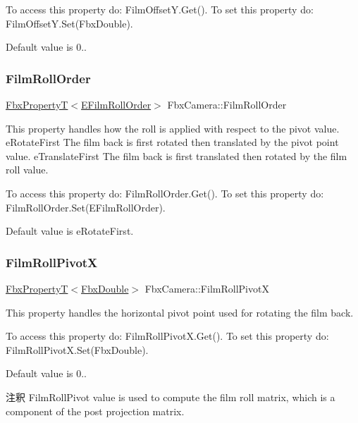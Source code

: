 To access this property do\+: Film\+Offset\+Y.\+Get(). To set this property do\+: Film\+Offset\+Y.\+Set(\+Fbx\+Double).

Default value is 0.. \mbox{\label{class_fbx_camera_ac7583ff2d3c73fa3e4f514ba29504be5}} 
\subsubsection{\texorpdfstring{Film\+Roll\+Order}{FilmRollOrder}}
{\footnotesize\ttfamily \hyperlink{class_fbx_property_t}{Fbx\+PropertyT}$<$\hyperlink{class_fbx_camera_a831d9b7ffcbf3611715eb2ad9108870b}{E\+Film\+Roll\+Order}$>$ Fbx\+Camera\+::\+Film\+Roll\+Order}

This property handles how the roll is applied with respect to the pivot value. e\+Rotate\+First The film back is first rotated then translated by the pivot point value. e\+Translate\+First The film back is first translated then rotated by the film roll value.

To access this property do\+: Film\+Roll\+Order.\+Get(). To set this property do\+: Film\+Roll\+Order.\+Set(\+E\+Film\+Roll\+Order).

Default value is e\+Rotate\+First. \mbox{\label{class_fbx_camera_af8db195197a3f0a6729533842e00fd18}} 
\subsubsection{\texorpdfstring{Film\+Roll\+PivotX}{FilmRollPivotX}}
{\footnotesize\ttfamily \hyperlink{class_fbx_property_t}{Fbx\+PropertyT}$<$\hyperlink{fbxtypes_8h_a171e72a1c46fc15c1a6c9c31948c1c5b}{Fbx\+Double}$>$ Fbx\+Camera\+::\+Film\+Roll\+PivotX}

This property handles the horizontal pivot point used for rotating the film back.

To access this property do\+: Film\+Roll\+Pivot\+X.\+Get(). To set this property do\+: Film\+Roll\+Pivot\+X.\+Set(\+Fbx\+Double).

Default value is 0.. \begin{DoxyRemark}{注釈}
Film\+Roll\+Pivot value is used to compute the film roll matrix, which is a component of the post projection matrix. 
\end{DoxyRemark}
\mbox{\label{class_fbx_camera_ab3034aa3a13b537c6542d8b45aa77eae}} 
